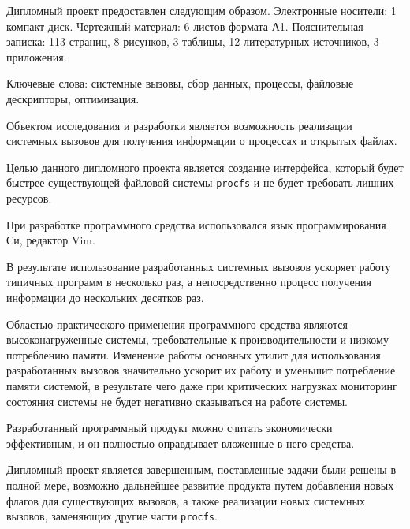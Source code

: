 \begin{titlepage}
\label{sec:ref}

Дипломный проект предоставлен следующим образом. Электронные носители: 1
компакт-диск. Чертежный материал: 6 листов формата А1. Пояснительная записка:
113 страниц, 8 рисунков, 3 таблицы, 12 литературных источников, 3 приложения.

Ключевые слова: системные вызовы, сбор данных, процессы, файловые дескрипторы,
оптимизация.

Объектом исследования и разработки является возможность реализации системных
вызовов для получения информации о процессах и открытых файлах.

Целью данного дипломного проекта является создание интерфейса, который будет
быстрее существующей файловой системы \texttt{procfs} и не будет требовать
лишних ресурсов.

При разработке программного средства использовался язык программирования Си,
редактор Vim. 

В результате использование разработанных системных вызовов ускоряет работу
типичных программ в несколько раз, а непосредственно процесс получения
информации до нескольких десятков раз.

Областью практического применения программного средства являются
высоконагруженные системы, требовательные к производительности и низкому
потреблению памяти. Изменение работы основных утилит для использования
разработанных вызовов значительно ускорит их работу и уменьшит потребление
памяти системой, в результате чего даже при критических нагрузках мониторинг
состояния системы не будет негативно сказываться на работе системы.

Разработанный программный продукт можно считать экономически эффективным, и он
полностью оправдывает вложенные в него средства.

Дипломный проект является завершенным, поставленные задачи были решены в полной
мере, возможно дальнейшее развитие продукта путем добавления новых флагов для
существующих вызовов, а также реализации новых системных вызовов, заменяющих
другие части \texttt{procfs}.
\end{titlepage}
